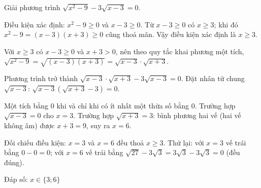 \begin{problem}[9DS-CAN-043]
Giải phương trình $\sqrt{x^2 - 9} - 3\sqrt{x - 3} = 0$.

\begin{solution}
Điều kiện xác định: $x^2 - 9 \geq 0$ và $x - 3 \geq 0$. Từ $x - 3 \geq 0$ có $x \geq 3$; khi đó $x^2 - 9 = (x - 3)(x + 3) \geq 0$ cũng thoả mãn. Vậy điều kiện xác định là $x \geq 3$.

Với $x \geq 3$ có $x - 3 \geq 0$ và $x + 3 > 0$, nên theo quy tắc khai phương một tích, $\sqrt{x^2 - 9} = \sqrt{(x - 3)(x + 3)} = \sqrt{x - 3} \cdot \sqrt{x + 3}$.

Phương trình trở thành $\sqrt{x - 3} \cdot \sqrt{x + 3} - 3\sqrt{x - 3} = 0$. Đặt nhân tử chung $\sqrt{x - 3}$: $\sqrt{x - 3}\left(\sqrt{x + 3} - 3\right) = 0$.

Một tích bằng $0$ khi và chỉ khi có ít nhất một thừa số bằng $0$. Trường hợp $\sqrt{x - 3} = 0$ cho $x = 3$. Trường hợp $\sqrt{x + 3} = 3$: bình phương hai vế (hai vế không âm) được $x + 3 = 9$, suy ra $x = 6$.

Đối chiếu điều kiện: $x = 3$ và $x = 6$ đều thoả $x \geq 3$. Thử lại: với $x = 3$ vế trái bằng $0 - 0 = 0$; với $x = 6$ vế trái bằng $\sqrt{27} - 3\sqrt{3} = 3\sqrt{3} - 3\sqrt{3} = 0$ (đều đúng).

Đáp số: $\boxed{x \in \{3; 6\}}$
\end{solution}
\end{problem}

